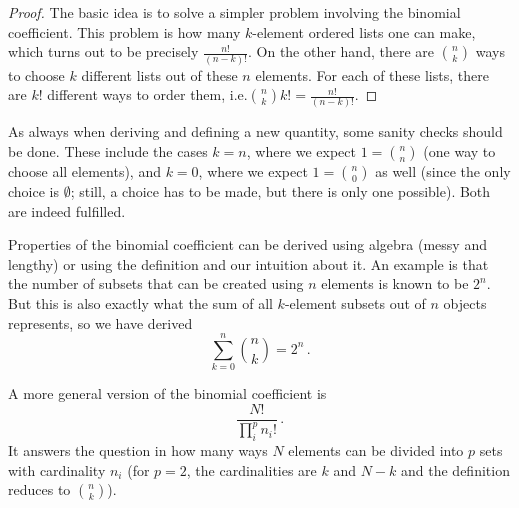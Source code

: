 \begin{proof}
The basic idea is to solve a simpler problem involving the binomial coefficient. This problem is how many $k$-element ordered lists one can make, which turns out to be precisely $\frac{n!}{(n - k)!}$. On the other hand, there are $\binom{n}{k}$ ways to choose $k$ different lists out of these $n$ elements. For each of these lists, there are $k!$ different ways to order them, i.e.$\binom{n}{k} k! = \frac{n!}{(n - k)!}$.
\end{proof}


As always when deriving and defining a new quantity, some sanity checks should be done. These include the cases $k = n$, where we expect $1 = \binom{n}{n}$ (one way to choose all elements), and $k = 0$, where we expect $1 = \binom{n}{0}$ as well (since the only choice is $\emptyset$; still, a choice has to be made, but there is only one possible). Both are indeed fulfilled.


Properties of the binomial coefficient can be derived using algebra (messy and lengthy) or using the definition and our intuition about it. An example is that the number of subsets that can be created using $n$ elements is known to be $2^n$. But this is also exactly what the sum of all $k$-element subsets out of $n$ objects represents, so we have derived
\begin{equation}
\sum_{k = 0}^n \binom{n}{k} = 2^n \, .
\end{equation}


A more general version of the binomial coefficient is
\begin{equation}
\frac{N!}{\prod_i^p n_i!} \, .
\end{equation}
It answers the question in how many ways $N$ elements can be divided into $p$ sets with cardinality $n_i$ (for $p = 2$, the cardinalities are $k$ and $N - k$ and the definition reduces to $\binom{n}{k}$).



